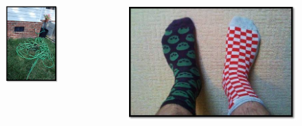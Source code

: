 \documentclass[aspectratio=169]{beamer}
\begin{document}
\begin{frame}
\begin{columns}
\begin{column}{0.3\textwidth}
      \begin{figure}
        \centering
        \includegraphics[width=1.00\textwidth]{img/hose.png}
        \label{fig:hose}
      \end{figure}

    \end{column}
    \begin{column}{0.3\textwidth}

      \begin{figure}
        \centering
        \includegraphics[width=1.00\textwidth]{img/socks.jpg}
        \label{fig:socks}
      \end{figure}


\end{column}
\end{columns}
\end{frame}
\end{document}
